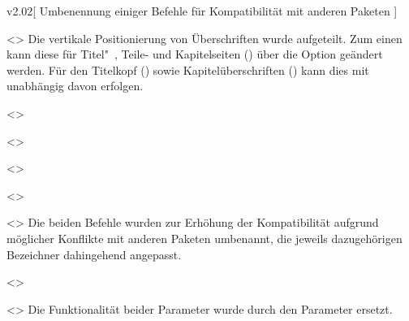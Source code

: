 \begin{Entity}{}
\begin{NoIndexDefault}
\begin{Cessations}{v2.02}[%
  Umbenennung einiger Befehle für Kompatibilität mit anderen Paketen%
]
\begin{Cessation}
  {}
  <>
\printdeclarationlist
%
Die vertikale Positionierung von Überschriften wurde aufgeteilt. Zum einen kann 
diese für Titel"~, Teile- und Kapitelseiten () über 
die Option  geändert werden. Für den Titelkopf
() sowie Kapitelüberschriften 
() kann dies mit  unabhängig 
davon erfolgen.
\end{Cessation}

\begin{Cessation}
  {}
  <>
\begin{Cessation}
  {}
  <>
\begin{Cessation}
  {}
  <>
\begin{Cessation}
  {}
  <>
\begin{Cessation}
  {}
  <>
\printdeclarationlist
%
Die beiden Befehle wurden zur Erhöhung der Kompatibilität aufgrund möglicher 
Konflikte mit anderen Paketen umbenannt, die jeweils dazugehörigen Bezeichner 
dahingehend angepasst.
\end{Cessation}
\end{Cessation}
\end{Cessation}
\end{Cessation}
\end{Cessation}

\begin{Declaration*}
  {}
\begin{Cessation}
  {}
  <>
\begin{Cessation}
  {}
  <>
\printdeclarationlist
%
Die Funktionalität beider Parameter wurde durch den Parameter 
 ersetzt.
\end{Cessation}
\end{Cessation}
\end{Declaration*}




\end{Cessations}
\end{NoIndexDefault}
\end{Entity}
